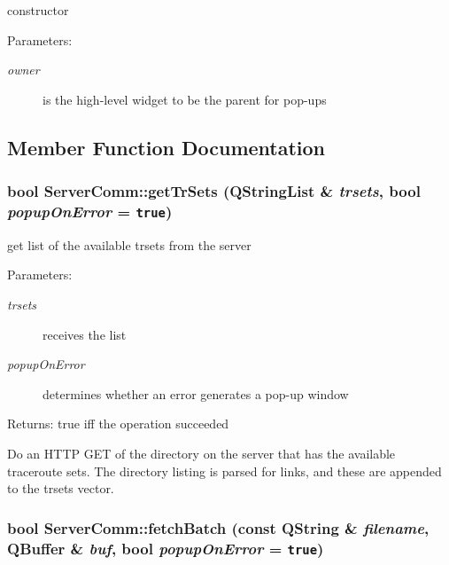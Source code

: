 constructor \begin{Desc}
\item[Parameters:]
\begin{description}
\item[{\em owner}]is the high-level widget to be the parent for pop-ups \end{description}
\end{Desc}


\subsection{Member Function Documentation}
\hypertarget{classServerComm_b93e71f0a8ce1f2eaf18c331a3112722}{
\subsubsection[getTrSets]{\setlength{\rightskip}{0pt plus 5cm}bool ServerComm::getTrSets (QStringList \& {\em trsets}, \/  bool {\em popupOnError} = {\tt true})}}
\label{classServerComm_b93e71f0a8ce1f2eaf18c331a3112722}


get list of the available trsets from the server \begin{Desc}
\item[Parameters:]
\begin{description}
\item[{\em trsets}]receives the list \item[{\em popupOnError}]determines whether an error generates a pop-up window \end{description}
\end{Desc}
\begin{Desc}
\item[Returns:]true iff the operation succeeded\end{Desc}
Do an HTTP GET of the directory on the server that has the available traceroute sets. The directory listing is parsed for links, and these are appended to the trsets vector. \hypertarget{classServerComm_b3918ae914534b6df5566c5ddb7059cf}{
\subsubsection[fetchBatch]{\setlength{\rightskip}{0pt plus 5cm}bool ServerComm::fetchBatch (const QString \& {\em filename}, \/  QBuffer \& {\em buf}, \/  bool {\em popupOnError} = {\tt true})}}
\label{classServerComm_b3918ae914534b6df5566c5ddb7059cf}


